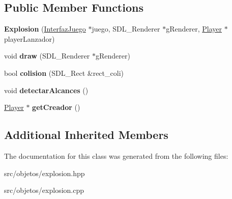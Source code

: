 \subsection*{Public Member Functions}
\begin{DoxyCompactItemize}
\item 
{\bfseries Explosion} (\hyperlink{class_interfaz_juego}{Interfaz\+Juego} $\ast$juego, S\+D\+L\+\_\+\+Renderer $\ast$g\+Renderer, \hyperlink{class_player}{Player} $\ast$player\+Lanzador)\hypertarget{class_explosion_a85068ed7729f0ad179fb7c764f96c0b1}{}\label{class_explosion_a85068ed7729f0ad179fb7c764f96c0b1}

\item 
void {\bfseries draw} (S\+D\+L\+\_\+\+Renderer $\ast$g\+Renderer)\hypertarget{class_explosion_ad93f3cca36426268c06a1c832c4ad7f8}{}\label{class_explosion_ad93f3cca36426268c06a1c832c4ad7f8}

\item 
bool {\bfseries colision} (S\+D\+L\+\_\+\+Rect \&rect\+\_\+coli)\hypertarget{class_explosion_a91dcbc01a6178dbb5e66a6209214aa56}{}\label{class_explosion_a91dcbc01a6178dbb5e66a6209214aa56}

\item 
void {\bfseries detectar\+Alcances} ()\hypertarget{class_explosion_aa381f273160b625c9a37e40e1ae0cda3}{}\label{class_explosion_aa381f273160b625c9a37e40e1ae0cda3}

\item 
\hyperlink{class_player}{Player} $\ast$ {\bfseries get\+Creador} ()\hypertarget{class_explosion_a8be576e77e5074fb3de9f6951d0887e1}{}\label{class_explosion_a8be576e77e5074fb3de9f6951d0887e1}

\end{DoxyCompactItemize}
\subsection*{Additional Inherited Members}


The documentation for this class was generated from the following files\+:\begin{DoxyCompactItemize}
\item 
src/objetos/explosion.\+hpp\item 
src/objetos/explosion.\+cpp\end{DoxyCompactItemize}
